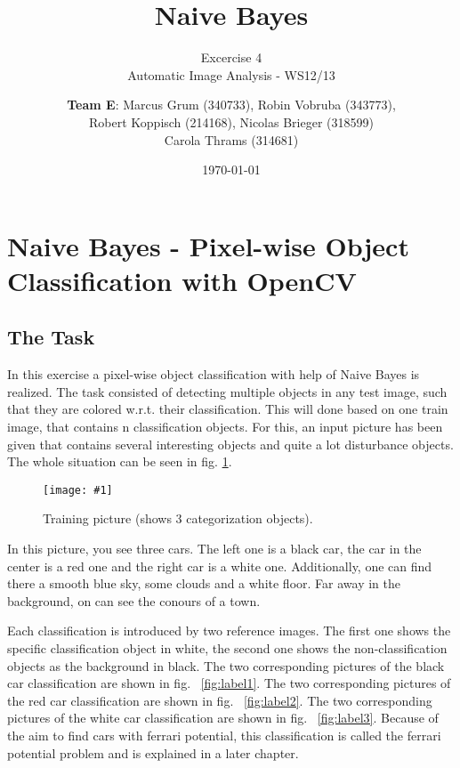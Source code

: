 \documentclass[a4paper,headings=small]{scrartcl}
\title{Naive Bayes}
\subtitle{Excercise 4 \\ Automatic Image Analysis - WS12/13}
\author{\textbf{Team E}: Marcus Grum (340733), Robin Vobruba (343773), \\ Robert Koppisch (214168), Nicolas Brieger (318599)\\Carola Thrams (314681)}
\date{\today}
\numberwithin{equation}{section} %
\numberwithin{figure}{section}   %
\newcommand{\image}[3]{
	\begin{figure}[htbp]
		\centering
		\texttt{[image: \#1]}
		\caption{#3}
		\label{fig:#1}
	\end{figure}
}
\newcommand{\generatedImgRoot}{../resources/img}
\begin{document}
\maketitle


\section{Naive Bayes - Pixel-wise Object Classification with OpenCV}


\subsection{The Task}
In this exercise a pixel-wise object classification with help of Naive Bayes is realized.
The task consisted of detecting multiple objects in any test image, 
such that they are colored w.r.t. their classification. 
This will done based on one train image, that contains n classification objects.
For this, an input picture has been given that contains several interesting objects and 
quite a lot disturbance objects. The whole situation can be seen in 
fig. \ref{fig:\generatedImgRoot/Input.png}.

\image{\generatedImgRoot/Input.png}{0.9}{%
		Training picture (shows 3 categorization objects).}
\newpage
In this picture, you see three cars. The left one is a black car,
the car in the center is a red one and the right car is a white one.
Additionally, one can find there a smooth blue sky, some clouds and a white floor.
Far away in the background, on can see the conours of a town.

Each classification is introduced by two reference images. 
The first one shows the specific classification object in white,
the second one shows the non-classification objects as the background in black.
The two corresponding pictures of the black car classification are shown in fig. ~\ref{fig:label1}.
The two corresponding pictures of the red car classification are shown in fig. ~\ref{fig:label2}.
The two corresponding pictures of the white car classification are shown in fig. ~\ref{fig:label3}.
Because of the aim to find cars with ferrari potential, this classification is called
the ferrari potential problem and is explained in a later chapter.
\end{document}
